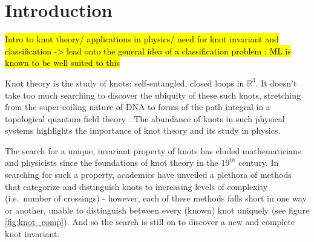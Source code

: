 \section{Introduction}



\hl{Intro to knot theory/ applications in physics/ need for knot invariant and classification -> lead onto the general idea of a classification problem : ML is known to be well suited to this}

Knot theory is the study of knots: self-entangled, closed loops in $\mathbb{R}^{3}$. It doesn't take too much searching to discover the ubiquity of these such knots, stretching from the super-coiling nature of DNA \cite{bauer1980supercoiled} to forms of the path integral in a topological quantum field theory \cite{witten1994quantum}. The abundance of knots in such physical systems highlights the importance of knot theory and its study in physics.

The search for a unique, invariant property of knots has eluded mathematicians and physicists since the foundations of knot theory in the $19^{th}$ century. In searching for such a property, academics have unveiled a plethora of methods that categorize and distinguish knots to increasing levels of complexity (i.e.\ number of crossings) - however, each of these methods falls short in one way or another, unable to distinguish between every (known) knot uniquely (see figure \ref{fig:knot_comp}). And so the search is still on to discover a new and complete knot invariant. 

